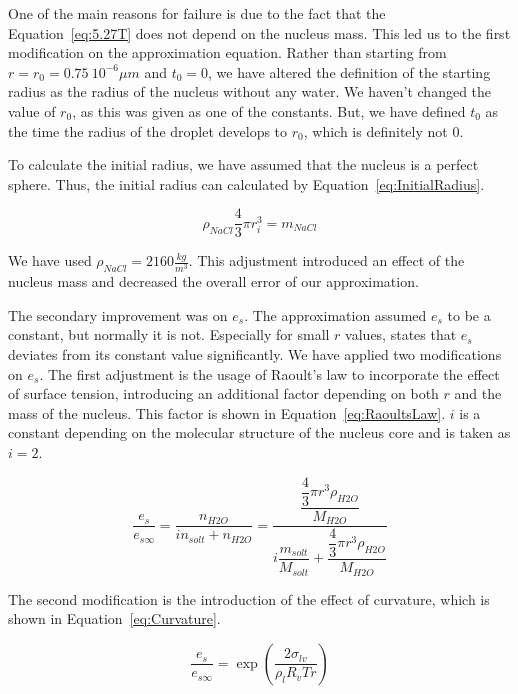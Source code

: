 \documentclass[]{article}
\begin{document}
One of the main reasons for failure is due to the fact that the
Equation~\eqref{eq:5.27T} does not depend on the nucleus mass. This led us to
the first modification on the approximation equation. Rather than starting from
$r=r_{0}=0.75\ 10^{-6} \mu m$ and $t_{0}=0$, we have altered the definition of
the starting radius as the radius of the nucleus without any water. We haven't
changed the value of $r_{0}$, as this was given as one of the constants. But,
we have defined $t_{0}$ as the time the radius of the droplet develops to
$r_{0}$, which is definitely not $0$.

To calculate the initial radius, we have assumed that the nucleus is a perfect
sphere. Thus, the initial radius can calculated by
Equation~\eqref{eq:InitialRadius}.

\begin{equation} \label{eq:InitialRadius}
    \rho_{NaCl}\frac{4}{3}\pi r_{i}^{3}=m_{NaCl}
\end{equation}

We have used $\rho_{NaCl}=2160 \frac{kg}{m^{3}}$. This adjustment introduced an
effect of the nucleus mass and decreased the overall error of our
approximation.

The secondary improvement was on $e_{s}$. The approximation assumed $e_{s}$ to
be a constant, but normally it is not. Especially for small $r$ values,
\cite{Best} states that $e_{s}$ deviates from its constant value significantly.
We have applied two modifications on $e_{s}$. The first adjustment is the usage
of Raoult's law to incorporate the effect of surface tension, introducing an
additional factor depending on both $r$ and the mass of the nucleus. This
factor is shown in Equation~\eqref{eq:RaoultsLaw}. $i$ is a constant depending
on the molecular structure of the nucleus core and is taken as $i=2$.

\begin{equation}
    \label{eq:RaoultsLaw}
    \dfrac{e_{s}}{e_{s\infty}}=\dfrac{n_{H2O}}{i n_{solt}+n_{H2O}}=\dfrac{\dfrac{\dfrac{4}{3}\pi r^{3} \rho_{H2O}}{M_{H2O}}}{i \dfrac{m_{solt}}{M_{solt}} + \dfrac{\dfrac{4}{3}\pi r^{3} \rho_{H2O}}{M_{H2O}}}
\end{equation}

The second modification is the introduction of the effect of curvature, which
is shown in Equation~\eqref{eq:Curvature}.

\begin{equation}
    \label{eq:Curvature}
    \dfrac{e_{s}}{e_{s\infty}}=\exp \left( \dfrac{2\sigma_{lv}}{\rho_{l}R_{v}Tr} \right)
\end{equation}
\end{document}
